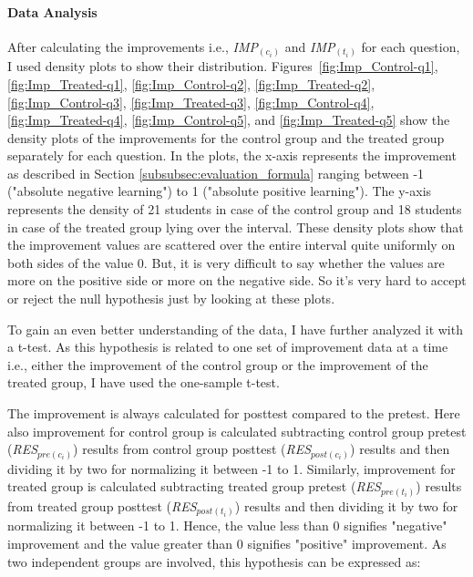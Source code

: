 \paragraph{Data Analysis}
After calculating the improvements i.e., \textit{IMP$_{(c_i)}$} and \textit{IMP$_{(t_i)}$} for each question, I used density plots to show their distribution. Figures~\ref{fig:Imp_Control-q1}, \ref{fig:Imp_Treated-q1}, \ref{fig:Imp_Control-q2}, \ref{fig:Imp_Treated-q2}, \ref{fig:Imp_Control-q3}, \ref{fig:Imp_Treated-q3}, \ref{fig:Imp_Control-q4}, \ref{fig:Imp_Treated-q4}, \ref{fig:Imp_Control-q5}, and \ref{fig:Imp_Treated-q5} show the density plots of the improvements for the control group and the treated group separately for each question. In the plots, the x-axis represents the improvement as described in Section \ref{subsubsec:evaluation_formula} ranging between -1 ("absolute negative learning") to 1 ("absolute positive learning"). The y-axis represents the density of 21 students in case of the control group and 18 students in case of the treated group lying over the interval.
These density plots show that the improvement values are scattered over the entire interval quite uniformly on both sides of the value 0. But, it is very difficult to say whether the values are more on the positive side or more on the negative side. So it's very hard to accept or reject the null hypothesis just by looking at these plots.

To gain an even better understanding of the data, I have further analyzed it with a t-test. As this hypothesis is related to one set of improvement data at a time i.e., either the improvement of the control group or the improvement of the treated group, I have used the one-sample t-test.   

The improvement is always calculated for posttest compared to the pretest. Here also improvement for control group is calculated subtracting control group pretest (\textit{RES$_{pre(c_i)}$}) results from control group posttest (\textit{RES$_{post(c_i)}$}) results and then dividing it by two for normalizing it between -1 to 1. Similarly, improvement for treated group is calculated subtracting treated group pretest (\textit{RES$_{pre(t_i)}$}) results from treated group posttest (\textit{RES$_{post(t_i)}$}) results and then dividing it by two for normalizing it between -1 to 1. Hence, the value less than 0 signifies "negative" improvement and the value greater than 0 signifies "positive" improvement. As two independent groups are involved, this hypothesis can be expressed as:   

